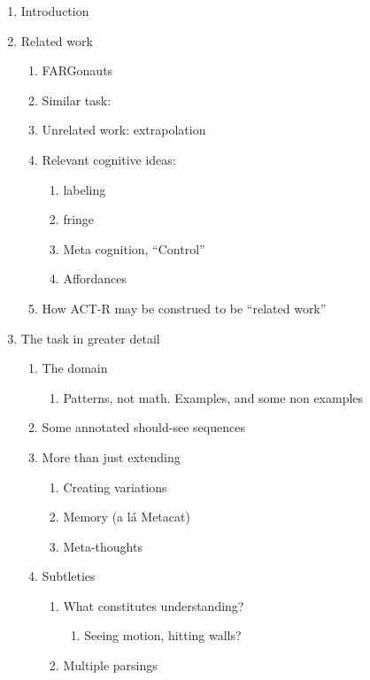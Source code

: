 \documentclass{article}
\begin{document}
\begin{enumerate}
\item Introduction
\item Related work
  \begin{enumerate}
  \item FARGonauts \cite{Mitchell90} \cite{Hofstadter:FCCA Chapter 1}
  \item Similar task: \cite{SimonKotovsky, Meredith, Laird, Persson, Pivar}
  \item Unrelated work: extrapolation
  \item Relevant cognitive ideas:
    \begin{enumerate}
    \item labeling
    \item fringe
    \item Meta cognition, ``Control''
    \item Affordances
    \end{enumerate}
  \item How ACT-R may be construed to be ``related work''
  \end{enumerate}
\item The task in greater detail
  \begin{enumerate}
  \item The domain
    \begin{enumerate}
    \item Patterns, not math. Examples, and some non examples
    \end{enumerate}
  \item Some annotated should-see sequences
  \item More than just extending
    \begin{enumerate}
    \item Creating variations
    \item Memory (a l\'a Metacat)
    \item Meta-thoughts
    \end{enumerate}
  \item Subtleties
    \begin{enumerate}
    \item What constitutes understanding?
      \begin{enumerate}
      \item Seeing motion, hitting walls?
      \end{enumerate}
    \item Multiple parsings
    \end{enumerate}
  \end{enumerate}

\end{enumerate}
\end{document}
